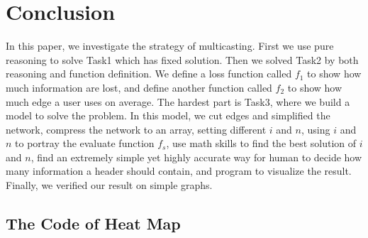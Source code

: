 \documentclass{mcmthesis}
\begin{document}
%
%
%


\section{Conclusion}

In this paper, we investigate the strategy of multicasting. First we use pure reasoning to solve Task1 which has fixed solution.
 Then we solved Task2 by both reasoning and function definition. We define a loss function called $f_{1}$ to show how much information are lost, and define another function called $f_{2}$ to show how much edge a user uses on average. The hardest part is Task3, where we build a model to solve the problem. In this model,
 we cut edges and simplified the network, compress the network to an array, setting different $i$ and $n$, using $i$ and $n$ to portray the evaluate function $f_{s}$, 
 use math skills to find the best solution of $i$ and $n$, find an extremely simple yet highly accurate way for human to decide how many information a header should contain, and program to
 visualize the result. Finally, we verified our result on simple graphs.

\newpage
\nocite{*}



\printbibliography

% 






\begin{appendices}
	\section{The Code of Heat Map}
	

\end{appendices}
\end{document}
